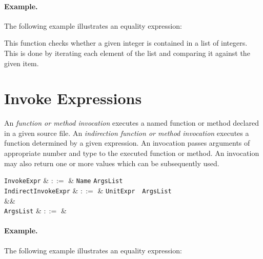 \paragraph{Example.}

The following example illustrates an equality expression:



This function checks whether a given integer is contained in a list of integers.  This is done by iterating each element of the list and comparing it against the given item.


\section{Invoke Expressions}
\label{c_expr_invoke}
An {\em function or method invocation} executes a named function or method declared in a given source file.  An {\em indirection function or method invocation} executes a function determined by a given expression.  An invocation passes arguments of appropriate number and type to the executed function or method.  An invocation may also return one or more values which can be subsequently used.


\begin{syntax}
  \verb+InvokeExpr+ & $::=$ & \verb+Name+ \token{(} \verb+ArgsList+ \token{)}\\
  \verb+IndirectInvokeExpr+ & $::=$ & \verb+UnitExpr+\ \token{(}\ \verb+ArgsList+\ \token{)}\\
&&\\
\verb+ArgsList+ & $::=$ & \\
\end{syntax}

\paragraph{Example.}

The following example illustrates an equality expression:




